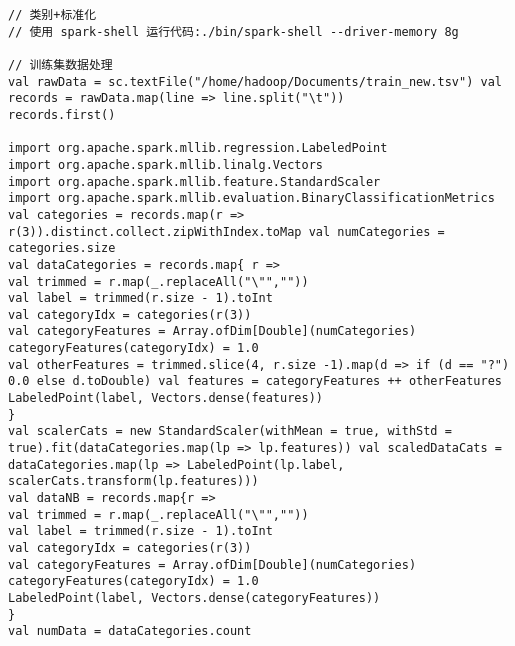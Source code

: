 \begin{lstlisting}
// 类别+标准化
// 使用 spark-shell 运行代码:./bin/spark-shell --driver-memory 8g

// 训练集数据处理
val rawData = sc.textFile("/home/hadoop/Documents/train_new.tsv") val records = rawData.map(line => line.split("\t"))
records.first()

import org.apache.spark.mllib.regression.LabeledPoint
import org.apache.spark.mllib.linalg.Vectors
import org.apache.spark.mllib.feature.StandardScaler
import org.apache.spark.mllib.evaluation.BinaryClassificationMetrics
val categories = records.map(r => r(3)).distinct.collect.zipWithIndex.toMap val numCategories = categories.size
val dataCategories = records.map{ r =>
val trimmed = r.map(_.replaceAll("\"",""))
val label = trimmed(r.size - 1).toInt
val categoryIdx = categories(r(3))
val categoryFeatures = Array.ofDim[Double](numCategories) categoryFeatures(categoryIdx) = 1.0
val otherFeatures = trimmed.slice(4, r.size -1).map(d => if (d == "?") 0.0 else d.toDouble) val features = categoryFeatures ++ otherFeatures
LabeledPoint(label, Vectors.dense(features))
}
val scalerCats = new StandardScaler(withMean = true, withStd = true).fit(dataCategories.map(lp => lp.features)) val scaledDataCats = dataCategories.map(lp => LabeledPoint(lp.label, scalerCats.transform(lp.features)))
val dataNB = records.map{r =>
val trimmed = r.map(_.replaceAll("\"",""))
val label = trimmed(r.size - 1).toInt
val categoryIdx = categories(r(3))
val categoryFeatures = Array.ofDim[Double](numCategories) categoryFeatures(categoryIdx) = 1.0
LabeledPoint(label, Vectors.dense(categoryFeatures))
}
val numData = dataCategories.count


\end{lstlisting}
